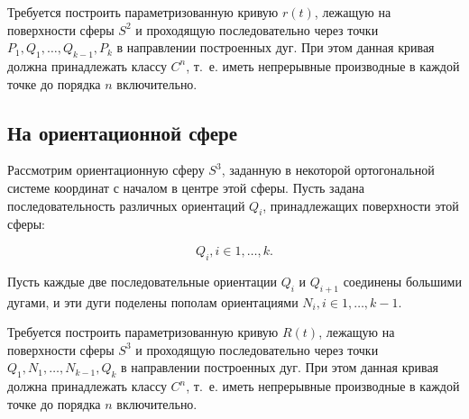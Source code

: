 Требуется построить параметризованную кривую $r(t)$, лежащую на поверхности сферы $S^2$ и проходящую последовательно
через точки $P_1, Q_1, \dots, Q_{k-1}, P_k$ в направлении построенных дуг. При этом данная кривая должна
принадлежать классу $C^n$, т.~е. иметь непрерывные производные в каждой точке до порядка $n$ включительно.

\subsection*{На ориентационной сфере}

Рассмотрим ориентационную сферу $S^3$, заданную в некоторой ортогональной сис\-теме координат с началом в центре этой
сферы. Пусть задана последовательность различных ориентаций $Q_i$, принадлежащих поверхности этой сферы:

$${Q_i}, i \in {1, \dots, k}.$$

Пусть каждые две последовательные ориентации $Q_i$ и $Q_{i+1}$ соединены большими дугами, и эти дуги поделены пополам
ориентациями $N_i, i \in {1, \dots, k-1}$.

Требуется построить параметризованную кривую $R(t)$, лежащую на поверхности сферы $S^3$ и проходящую последовательно
через точки $Q_1, N_1, \dots, N_{k-1}, Q_k$ в направлении построенных дуг. При этом данная кривая должна
принадлежать классу $C^n$, т.~е. иметь непрерывные производные в каждой точке до порядка $n$ включительно.
